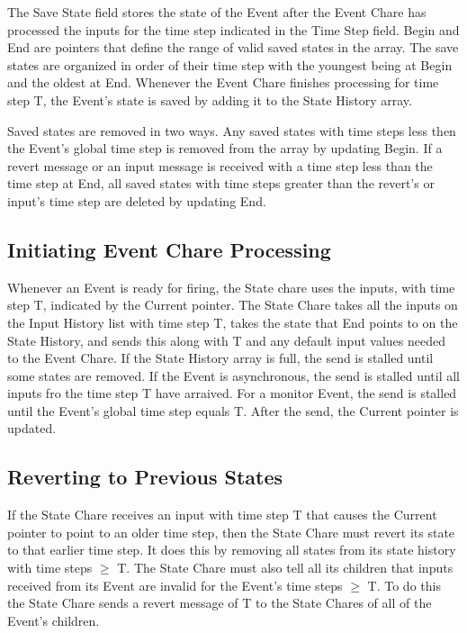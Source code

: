 The Save State field stores the state of the Event after the Event
Chare has processed the inputs for the time step indicated in the Time
Step field.  Begin and End are pointers that define the range of valid
saved states in the array.  The save states are organized in order of
their time step with the youngest being at Begin and the oldest at
End.  Whenever the Event Chare finishes processing for time step T,
the Event's state is saved by adding it to the State History array.

Saved states are removed in two ways.  Any saved states with time
steps less then the Event's global time step is removed from the array
by updating Begin.  If a revert message or an input message is
received with a time step less than the time step at End, all saved
states with time steps greater than the revert's or input's time step
are deleted by updating End.

\subsection{Initiating Event Chare Processing}

Whenever an Event is ready for firing, the State chare uses the inputs,
with time step T, indicated by the Current pointer.  The State
Chare takes all the inputs on the Input History list with time step T,
takes the state that End points to on the State History, and sends
this along with T and any default input values needed to the Event
Chare.  If the State History array is full, the send is stalled until
some states are removed.  If the Event is asynchronous, the send is
stalled until all inputs fro the time step T have arraived.  For a
monitor Event, the send is stalled until the Event's global time step
equals T.  After the send, the Current pointer is updated.

\subsection{Reverting to Previous States}

If the State Chare receives an input with time step T that causes the
Current pointer to point to an older time step, then the State Chare
must revert its state to that earlier time step.  It does this by
removing all states from its state history with time steps $\geq$ T.  The
State Chare must also tell all its children that inputs received from
its Event are invalid for the Event's time steps $\geq$ T.  To do this the
State Chare sends a revert message of T to the State Chares of all of
the Event's children.

